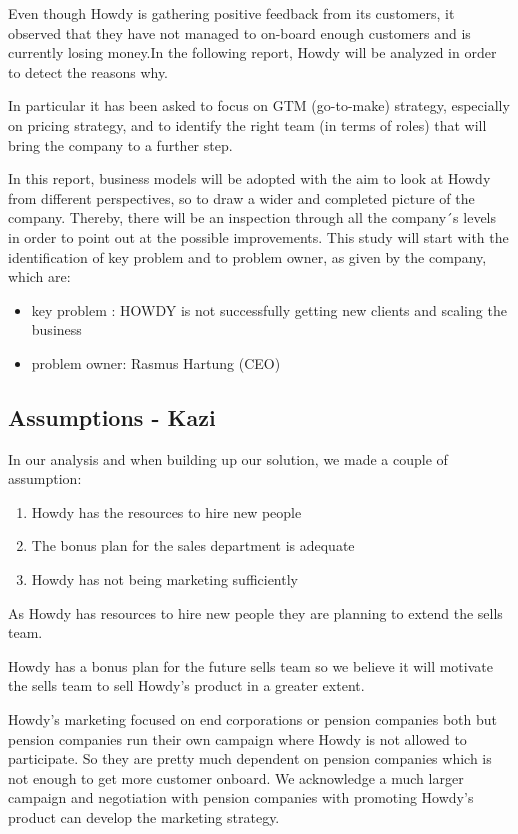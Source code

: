 \noindent Even though Howdy is gathering positive feedback from its customers, it observed that they have not managed to on-board enough customers and is currently losing money.In the following report, Howdy will be analyzed in order to detect the reasons why.

\noindent In particular it has been asked to focus on GTM (go-to-make) strategy, especially on pricing strategy, and to identify the right team (in terms of roles) that will bring the company to a further step.\cite[s.39]{oneofthepresentations}

\noindent In this report, business models will be adopted with the aim to look at Howdy from different perspectives, so to draw a wider and completed picture of the company.  Thereby, there will be an inspection through all the company´s levels in order to point out at the possible improvements. This study will start with the identification of key problem and to problem owner, as given by the company, which are:


\begin{itemize}
  \item key problem : HOWDY is not successfully getting new clients and scaling the business\cite[s.38]{oneofthepresentations}
  \item problem owner: Rasmus Hartung (CEO)\cite[s.5]{oneofthepresentations}
\end{itemize}





\subsection{Assumptions - Kazi}

In our analysis and when building up our solution, we made a couple of assumption:

\begin{enumerate}
    \item Howdy has the resources to hire new people 
    \item The bonus plan for the sales department is adequate 
    \item Howdy has not being marketing sufficiently 
\end{enumerate}

\noindent As Howdy has resources to hire new people they are planning to extend the sells team.

\noindent Howdy has a bonus plan for the future sells team so we believe it will motivate the sells team to sell Howdy’s product in a greater extent.

\noindent Howdy’s marketing focused on end corporations or pension companies both but pension companies run their own campaign where Howdy is not allowed to participate. So they are pretty much dependent on pension companies which is not enough to get more customer onboard. We acknowledge a much larger campaign and negotiation with pension companies with promoting Howdy’s product can develop the marketing strategy.
